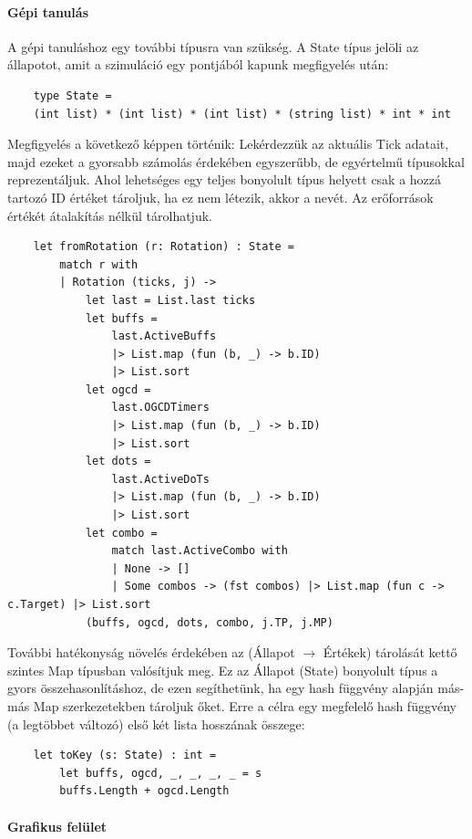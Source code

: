 \documentclass[12pt]{article}
\begin{document}
	\paragraph{Gépi tanulás}
	
	A gépi tanuláshoz egy további típusra van szükség. A State típus jelöli az állapotot, amit a szimuláció egy pontjából kapunk megfigyelés után:
	
	\begin{lstlisting}
	type State = 
	(int list) * (int list) * (int list) * (string list) * int * int
	\end{lstlisting}
	
	Megfigyelés a következő képpen történik: Lekérdezzük az aktuális Tick adatait, majd ezeket a gyorsabb számolás érdekében egyszerűbb, de egyértelmű típusokkal reprezentáljuk.
	Ahol lehetséges egy teljes bonyolult típus helyett csak a hozzá tartozó ID értéket tároljuk, ha ez nem létezik, akkor a nevét. Az erőforrások értékét átalakítás nélkül tárolhatjuk.
	
	\begin{lstlisting}
	let fromRotation (r: Rotation) : State =
		match r with
		| Rotation (ticks, j) ->
			let last = List.last ticks
			let buffs =
				last.ActiveBuffs
				|> List.map (fun (b, _) -> b.ID)
				|> List.sort
			let ogcd =
				last.OGCDTimers
				|> List.map (fun (b, _) -> b.ID)
				|> List.sort
			let dots =
				last.ActiveDoTs
				|> List.map (fun (b, _) -> b.ID)
				|> List.sort
			let combo =
				match last.ActiveCombo with
				| None -> []
				| Some combos -> (fst combos) |> List.map (fun c -> c.Target) |> List.sort
			(buffs, ogcd, dots, combo, j.TP, j.MP)
	\end{lstlisting}
	
	További hatékonyság növelés érdekében az (Állapot $\rightarrow$ Értékek) tárolását kettő szintes Map típusban valósítjuk meg.
	Ez az Állapot (State) bonyolult típus a gyors összehasonlításhoz, de ezen segíthetünk, ha egy hash függvény alapján más-más Map szerkezetekben tároljuk őket. 
	Erre a célra egy megfelelő hash függvény (a legtöbbet változó) első két lista hosszának összege:
	
	\begin{lstlisting}
	let toKey (s: State) : int =
		let buffs, ogcd, _, _, _, _ = s
		buffs.Length + ogcd.Length
	\end{lstlisting}
	
	\paragraph{Grafikus felület}
	
\end{document}
